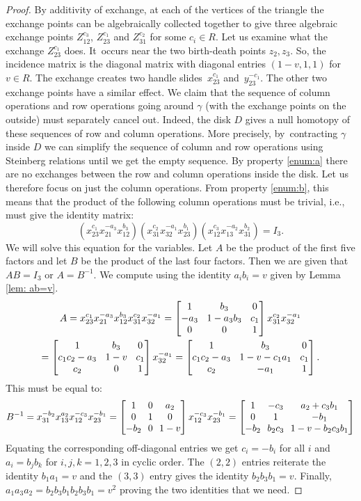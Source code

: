 \documentclass[11pt]{article}
\newcommand{\ie}{i.e.,\xspace}
\numberwithin{equation}{section}\providecommand{\dpl}{\displaystyle}
\theoremstyle{plain}
\theoremstyle{definition}
\newcommand{\mat}[1]{\ensuremath{
\left[\begin{matrix}#1
\end{matrix}\right]
}}
\begin{document}
\begin{proof}
By additivity of exchange, at each of the vertices of the triangle the exchange points can be algebraically collected together to give three algebraic exchange points $Z_{12}^{c_3}$, $Z_{23}^{c_1}$ and $Z_{31}^{c_2}$ for some $c_i\in R$.
Let us examine what the exchange $Z_{23}^{c_1}$ does. It~occurs near the two birth-death points $z_2,z_3$. So, the incidence matrix is the diagonal matrix with diagonal entries $(1-v,1,1)$ for $v\in R$. The exchange creates two handle slides~$x_{23}^{c_1}$ and~$y_{23}^{-c_1}$. The other two exchange points have a similar effect. We claim that the sequence of column operations and row operations going around $\gamma$ (with the exchange points on the outside) must separately cancel out. Indeed, the disk $D$ gives a null homotopy of these sequences of row and column operations. More precisely, by~contracting $\gamma$ inside $D$ we can simplify the sequence of column and row operations using Steinberg relations until we get the empty sequence. By property \eqref{enum:a} there are no exchanges between the row and column operations inside the disk. Let us therefore focus on just the column operations. From property \eqref{enum:b}, this means that the product of the following column operations must be trivial, \ie must give the identity matrix:
\[
(x_{23}^{c_1}x_{21}^{-a_3}x_{12}^{b_3})
(x_{31}^{c_2}x_{32}^{-a_1}x_{23}^{b_1})
(x_{12}^{c_3}x_{13}^{-a_2}x_{31}^{b_2})=I_3.
\]
We will solve this equation for the variables. Let $A$ be the product of the first five factors and let $B$ be the product of the last four factors. Then we are given that $AB=I_3$ or $A=B^{-1}$. We compute using the identity $a_ib_i=v$ given by Lemma \ref{lem: ab=v}.
\begin{multline*}
\arraycolsep4.5pt
A=x_{23}^{c_1}x_{21}^{-a_3}x_{12}^{b_3}x_{31}^{c_2}x_{32}^{-a_1}=\mat{1 & b_3 & 0\\
-a_3 & 1-a_3b_3 & c_1\\
0 & 0 & 1
}x_{31}^{c_2}x_{32}^{-a_1}
\\ \arraycolsep4.5pt
= \mat{1 & b_3 & 0\\
c_1c_2-a_3 & 1-v & c_1\\
c_2 & 0 & 1}x_{32}^{-a_1}
= \mat{1 & b_3 & 0\\
c_1c_2-a_3 & 1-v-c_1a_1 & c_1\\
c_2 & -a_1 & 1}.
\end{multline*}
This must be equal to:
\[\arraycolsep3.5pt
B^{-1}=x_{31}^{-b_2}x_{13}^{a_2}x_{12}^{-c_3}x_{23}^{-b_1}=\mat{1 & 0 & a_2\\
0 & 1 & 0\\
-b_2 & 0 & 1-v}x_{12}^{-c_3}x_{23}^{-b_1}
= \mat{
1 & -c_3 & a_2+c_3b_1\\
0 & 1 & -b_1\\
-b_2 & b_2c_3 & 1-v-b_2c_3b_1
}
\]
Equating the corresponding off-diagonal entries we get $c_i=-b_i$ for all $i$ and $a_i=b_jb_k$ for $i,j,k=1,2,3$ in cyclic order. The $(2,2)$ entries reiterate the identity $b_1a_1=v$ and the $(3,3)$ entry gives the identity $b_2b_3b_1=v$. Finally, $a_1a_3a_2=b_2b_3b_1b_2b_3b_1=v^2$ proving the two identities that we need.


\end{proof}
\end{document}
